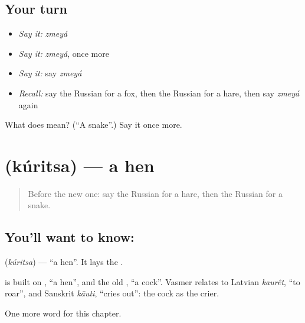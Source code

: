 \subsection*{Your turn}
\begin{itemize}
\raggedright
  \item \emph{Say it:} \emph{zmeyá}
  \item \emph{Say it:} \emph{zmeyá}, once more
  \item \emph{Say it:} say \emph{zmeyá}
  \item \emph{Recall:} say the Russian for a fox, then the Russian for a hare, then say \emph{zmeyá} again
\end{itemize}

\begin{tcolorbox}[breakable,colback=teal!4,colframe=teal!35!black,title={Before you move on}]
What does  mean? (\textquotedblleft{}A snake\textquotedblright{}.) Say it once more.
\end{tcolorbox}
\section[\texorpdfstring{\ru{курица} (kúritsa)}{курица (kúritsa)}]{ (kúritsa) — a hen}

\label{lesson:RU-C62-hen}



\begin{quote}
Before the new one: say the Russian for a hare, then the Russian for a snake.
\end{quote}

\subsection*{You'll want to know: }
\textbf{} (\emph{kúritsa}) — \textquotedblleft{}a hen\textquotedblright{}. It lays the \textbf{}.

\begin{cousinweb}
\textbf{} is built on \emph{}, \textquotedblleft{}a hen\textquotedblright{}, and the old \emph{}, \textquotedblleft{}a cock\textquotedblright{}. Vasmer relates \emph{} to Latvian \emph{kaurêt}, \textquotedblleft{}to roar\textquotedblright{}, and Sanskrit \emph{kāuti}, \textquotedblleft{}cries out\textquotedblright{}: the cock as the crier.
\end{cousinweb}

\begin{grammarlens}[title={What you've built}]
One more word for this chapter.
\end{grammarlens}

